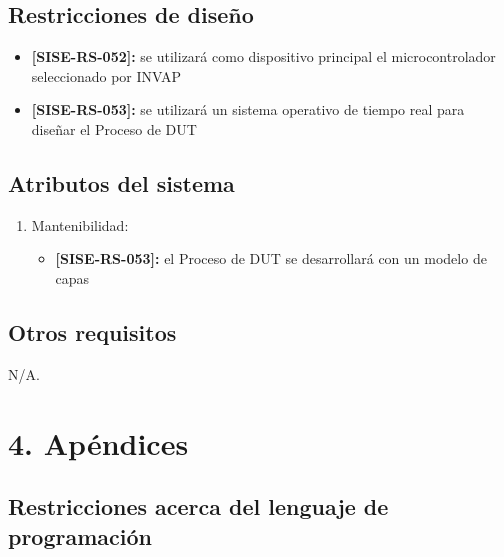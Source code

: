 \documentclass[
11pt, %
codirector, %
]{charter}
\def\codigo{SISE-RS}
\newcommand{\req}[1]{\textbf{[\codigo-#1]:}}
\begin{document}
\subsection{Restricciones de diseño}
\label{sub:restriccionesDiseño}

\begin{itemize}
	\item \req{052} se utilizará como dispositivo principal el microcontrolador seleccionado por INVAP
	\item \req{053} se utilizará un sistema operativo de tiempo real para diseñar el Proceso de DUT
\end{itemize}

\subsection{Atributos del sistema}
\label{sub:atributos}

\begin{enumerate}
	\item Mantenibilidad:
	\begin{itemize}
		\item \req{053} el Proceso de DUT se desarrollará con un modelo de capas
	\end{itemize}
\end{enumerate}

\subsection{Otros requisitos}
\label{sub:otros}

N/A.

\section{4. Apéndices}
\label{sec:apendices}



\subsection{Restricciones acerca del lenguaje de programación}
\end{document}
